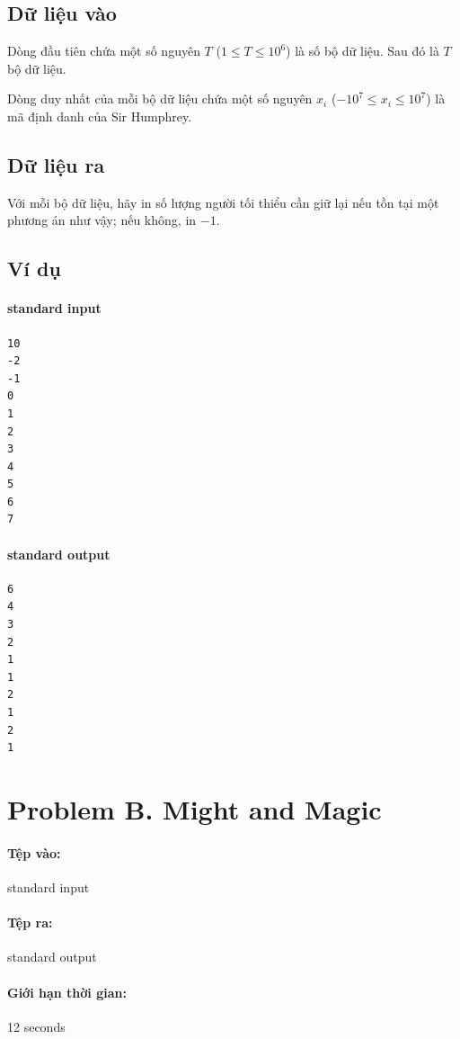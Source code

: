 \documentclass[11pt]{article}
\begin{document}
\subsection*{Dữ liệu vào}

Dòng đầu tiên chứa một số nguyên \(T\) (\(1\le T\le 10^6\)) là số bộ dữ
liệu. Sau đó là \(T\) bộ dữ liệu.

Dòng duy nhất của mỗi bộ dữ liệu chứa một số nguyên \(x_i\)
(\(-10^7\le x_i\le 10^7\)) là mã định danh của Sir Humphrey.

\subsection*{Dữ liệu ra}

Với mỗi bộ dữ liệu, hãy in số lượng người tối thiểu cần giữ lại nếu tồn tại
một phương án như vậy; nếu không, in \(-1\).

\subsection*{Ví dụ}

\paragraph{standard input}
\begin{verbatim}
10
-2
-1
0
1
2
3
4
5
6
7
\end{verbatim}

\paragraph{standard output}
\begin{verbatim}
6
4
3
2
1
1
2
1
2
1
\end{verbatim}

\section{Problem B. Might and Magic}

\paragraph{Tệp vào:} standard input
\paragraph{Tệp ra:} standard output
\paragraph{Giới hạn thời gian:} 12 seconds
\end{document}
